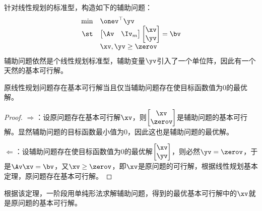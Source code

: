 \documentclass{ctexart}
\begin{document}
针对线性规划的标准型，构造如下的辅助问题：
\begin{align*}
    \begin{array}{rl}
        \min & \onev^\top \yv      \\
        \st  & \begin{bmatrix}
                   \Av & \Iv_m
               \end{bmatrix}
        \begin{bmatrix}
            \xv \\ \yv
        \end{bmatrix} = \bv        \\
             & \xv, \yv \ge \zerov
    \end{array}
\end{align*}
辅助问题依然是个线性规划标准型，辅助变量$\yv$引入了一个单位阵，因此有一个天然的基本可行解。

\begin{theorem}
    原线性规划问题存在基本可行解当且仅当辅助问题存在使目标函数值为$0$的最优解。
\end{theorem}

\begin{proof}
    $\Rightarrow$：设原问题存在基本可行解$\xv$，则$\begin{bmatrix}
            \xv \\ \zerov
        \end{bmatrix}$是辅助问题的基本可行解。显然辅助问题的目标函数最小值为$0$，因此这也是辅助问题的最优解。

    $\Leftarrow$：设辅助问题存在使目标函数值为$0$的最优解$\begin{bmatrix}
            \xv \\ \yv
        \end{bmatrix}$，则必然$\yv = \zerov$，于是$\Av \xv = \bv$，又$\xv \ge \zerov$，即$\xv$是原问题的可行解，根据线性规划基本定理，原问题存在基本可行解。
\end{proof}

根据该定理，一阶段用单纯形法求解辅助问题，得到的最优基本可行解中的$\xv$就是原问题的基本可行解。
\end{document}
